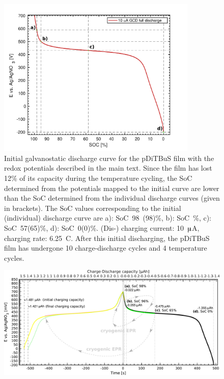 \begin{figure}[!ht]
\center
	\includegraphics[width=0.85\textwidth]{./pulse/figures/Figure_S3}
	\caption{Initial galvanostatic discharge curve for the pDiTBuS film with the redox potentials described in the main text. Since the film has lost 12\% of its capacity during the temperature cycling, the SoC determined from the potentials mapped to the initial curve are lower than the SoC determined from the individual discharge curves (given in brackets). The SoC values corresponding to the initial (individual) discharge curve are a): SoC~98~(98)\%, b): SoC~\%, c): SoC~57(65)\%, d): SoC~0(0)\%. (Dis-) charging current: 10~$\muup$A, charging rate: 6.25~C. After this initial discharging, the pDiTBuS film has undergone 10 charge-discharge cycles and 4 temperature cycles.}
	\label{fig:Figure_S3}
\end{figure}

\begin{figure}[!ht]
\center
	\includegraphics[width=1\textwidth]{./pulse/figures/Figure_S27}
	\caption{}
	\label{fig:Figure_S27}
\end{figure}

